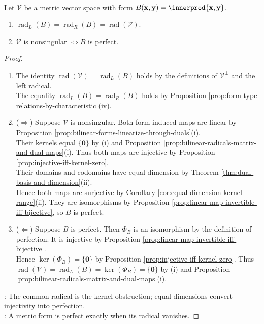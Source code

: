 \begin{proposition} \label{prop:metric-radical-equals-bilinear-radicals} \\
Let $\mathcal{V}$ be a metric vector space with form $B(\mathbf{x},\mathbf{y})=\innerprod{\mathbf{x},\mathbf{y}}$.
\begin{enumerate}[label=(\roman*)]
\setlength{\itemsep}{0pt}
\item $\operatorname{rad}_{L}(B)=\operatorname{rad}_{R}(B)=\operatorname{rad}(\mathcal{V})$.
\item $\mathcal{V}$ is nonsingular $\Longleftrightarrow B$ is perfect.
\end{enumerate}
\begin{proof}
\begin{enumerate}[label=(\roman*)]
\setlength{\itemsep}{0pt}
\item[$(i)$] The identity $\operatorname{rad}(\mathcal{V})=\operatorname{rad}_{L}(B)$ holds by the definitions of $\mathcal{V}^{\perp}$ and the left radical.\\
The equality $\operatorname{rad}_{L}(B)=\operatorname{rad}_{R}(B)$ holds by Proposition \ref{prop:form-type-relations-by-characteristic}(iv).
\item[$(ii)$] ($\Rightarrow$) Suppose $\mathcal{V}$ is nonsingular. Both form-induced maps are linear by Proposition \ref{prop:bilinear-forms-linearize-through-duals}(i).\\
Their kernels equal $\{\mathbf{0}\}$ by (i) and Proposition \ref{prop:bilinear-radicals-matrix-and-dual-maps}(i). Thus both maps are injective by Proposition \ref{prop:injective-iff-kernel-zero}.\\
Their domains and codomains have equal dimension by Theorem \ref{thm:dual-basis-and-dimension}(ii).\\
Hence both maps are surjective by Corollary \ref{cor:equal-dimension-kernel-range}(ii). They are isomorphisms by Proposition \ref{prop:linear-map-invertible-iff-bijective}, so $B$ is perfect.
\item[$(ii)$] ($\Leftarrow$) Suppose $B$ is perfect. Then $\Phi_B$ is an isomorphism by the definition of perfection. It is injective by Proposition \ref{prop:linear-map-invertible-iff-bijective}.\\
Hence $\ker(\Phi_B)=\{\mathbf{0}\}$ by Proposition \ref{prop:injective-iff-kernel-zero}. Thus $\operatorname{rad}(\mathcal{V})=\operatorname{rad}_{L}(B)=\ker(\Phi_B)=\{\mathbf{0}\}$ by (i) and Proposition \ref{prop:bilinear-radicals-matrix-and-dual-maps}(i).
\end{enumerate}
: The common radical is the kernel obstruction; equal dimensions convert injectivity into perfection.\\
: A metric form is perfect exactly when its radical vanishes.
\end{proof}
\end{proposition}

